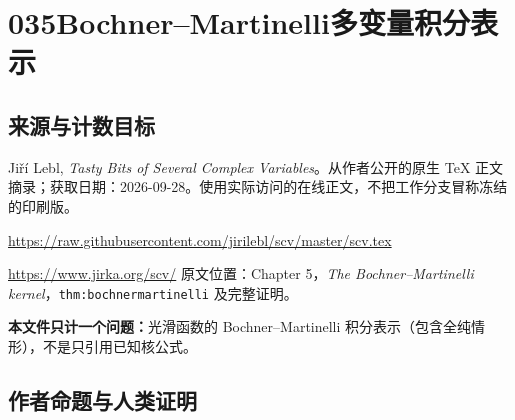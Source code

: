 \documentclass[UTF8,11pt]{ctexart}
\theoremstyle{definition}
\begin{document}
\section*{035\quad Bochner--Martinelli多变量积分表示}
\subsection*{来源与计数目标}
Ji\v{r}\'i Lebl, \emph{Tasty Bits of Several Complex Variables}。从作者公开的原生 TeX 正文摘录；获取日期：2026-09-28。使用实际访问的在线正文，不把工作分支冒称冻结的印刷版。
\par\url{https://raw.githubusercontent.com/jirilebl/scv/master/scv.tex}
\par\url{https://www.jirka.org/scv/}
原文位置：Chapter 5，\emph{The Bochner--Martinelli kernel}，\texttt{thm:bochnermartinelli} 及完整证明。
\par\textbf{本文件只计一个问题：}光滑函数的 Bochner--Martinelli 积分表示（包含全纯情形），不是只引用已知核公式。
\subsection*{作者命题与人类证明}
\end{document}
